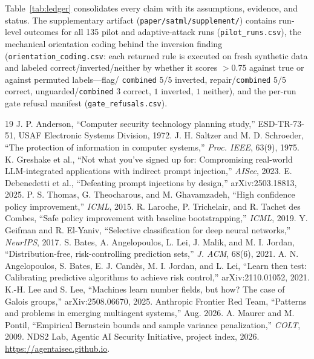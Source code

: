 \documentclass[conference]{IEEEtran}
\begin{document}
Table~\ref{tab:ledger} consolidates every claim with its assumptions,
evidence, and status. The supplementary artifact
(\texttt{paper/satml/supplement/}) contains run-level outcomes for all
135 pilot and adaptive-attack runs (\texttt{pilot\_runs.csv}), the
mechanical orientation coding behind the inversion finding
(\texttt{orientation\_coding.csv}: each returned rule is executed on
fresh synthetic data and labeled correct/inverted/neither by whether
it scores $>0.75$ against true or against permuted labels---flag/%
\texttt{combined} $5/5$ inverted, repair/\texttt{combined} $5/5$
correct, unguarded/\texttt{combined} $3$ correct, $1$ inverted, $1$
neither), and the per-run gate refusal manifest
(\texttt{gate\_refusals.csv}).

\begin{thebibliography}{19}
 J. P. Anderson, ``Computer security technology
planning study,'' ESD-TR-73-51, USAF Electronic Systems Division, 1972.
 J. H. Saltzer and M. D. Schroeder, ``The
protection of information in computer systems,'' \emph{Proc. IEEE},
63(9), 1975.
 K. Greshake et al., ``Not what you've signed up
for: Compromising real-world LLM-integrated applications with indirect
prompt injection,'' \emph{AISec}, 2023.
 E. Debenedetti et al., ``Defeating prompt
injections by design,'' arXiv:2503.18813, 2025.
 P. S. Thomas, G. Theocharous, and M. Ghavamzadeh,
``High confidence policy improvement,'' \emph{ICML}, 2015.
 R. Laroche, P. Trichelair, and R. Tachet des
Combes, ``Safe policy improvement with baseline bootstrapping,''
\emph{ICML}, 2019.
 Y. Geifman and R. El-Yaniv, ``Selective
classification for deep neural networks,'' \emph{NeurIPS}, 2017.
 S. Bates, A. Angelopoulos, L. Lei, J. Malik, and
M. I. Jordan, ``Distribution-free, risk-controlling prediction sets,''
\emph{J. ACM}, 68(6), 2021.
 A. N. Angelopoulos, S. Bates, E. J.
Cand\`es, M. I. Jordan, and L. Lei, ``Learn then test: Calibrating
predictive algorithms to achieve risk control,'' arXiv:2110.01052, 2021.
 K.-H. Lee and S. Lee, ``Machines learn number
fields, but how? The case of Galois groups,'' arXiv:2508.06670, 2025.
 Anthropic Frontier Red Team, ``Patterns and
problems in emerging multiagent systems,'' Aug. 2026.
 A. Maurer and M. Pontil, ``Empirical
Bernstein bounds and sample variance penalization,'' \emph{COLT}, 2009.
 NDS2 Lab, Agentic AI Security Initiative, project
index, 2026. \url{https://agentaisec.github.io}.
\end{thebibliography}
\end{document}
